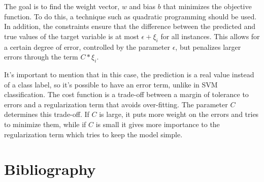 \documentclass[11pt]{article}
\theoremstyle{definition}
\begin{document}
The goal is to find the weight vector, $w$ and bias $b$ that minimizes the objective function. To do this, a technique such as quadratic programming should be used. In addition, the constraints ensure that the difference between the predicted and true values of the target variable is at most $\epsilon + \xi_i$ for all instances. This allows for a certain degree of error, controlled by the parameter $\epsilon$, but penalizes larger errors through the term $C * \xi_i$.

It's important to mention that in this case, the prediction is a real value instead of a class label, so it's possible to have an error term, unlike in SVM classification. The cost function is a trade-off between a margin of tolerance to errors and a regularization term that avoids over-fitting. The parameter $C$ determines this trade-off. If $C$ is large, it puts more weight on the errors and tries to minimize them, while if $C$ is small it gives more importance to the regularization term which tries to keep the model simple.

\citet{trafalisSVM}

\newpage

\citet{trafalisSVM}

\newpage


\section{Bibliography}
\printbibliography
\end{document}
